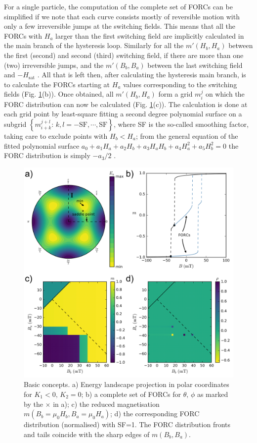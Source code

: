 For a single particle, the computation of the complete set of FORCs can be simplified if we note that each curve consists mostly of reversible motion with only a few irreversible jumps at the switching fields. This means that all the FORCs with $H_a$ larger than the first switching field are implicitly calculated in the main branch of the hysteresis loop. Similarly for all the $m'(H_b, H_a)$ between the first (second) and second (third) switching field, if there are more than one (two) irreversible jumps, and the $m'(B_b, B_a)$ between the last switching field and $-H_{\text{sat}}$ . All that is left then, after calculating the hysteresis main branch, is to calculate the FORCs starting at $H_a$ values corresponding to the switching fields (Fig. \ref{FIG01}(b)). Once obtained, all $m'(H_b, H_a)$ form a grid $m_i^j$ on which the FORC distribution can now be calculated (Fig. \ref{FIG01}(c)). The calculation is done at each grid point by least-square fitting a second degree polynomial surface on a subgrid $\left\{ m_{i+k}^{j+l}:\, k, l=-\text{SF},\cdots,\text{SF} \right\}$, where SF is the so-called smoothing factor, taking care to exclude points with $H_b<H_a$; from the general equation of the fitted polynomial surface $a_0 + a_1 H_a + a_2 H_b + a_3 H_a H_b + a_4 H_a^2 + a_5 H_b^2 = 0$ the FORC distribution is simply $-a_3/2$ \citep{Pike1999}.
\begin{figure}
\includegraphics[width=\textwidth]{research-2/figs/FIG01.pdf}
\caption[Basic FORC modelling concepts]{Basic concepts. a) Energy landscape projection in polar coordinates for $K_1<0,\, K_2=0$; b) a complete set of FORCs for $\theta ,\,\phi$ as marked by the $\boldsymbol{\times}$ in a); c) the reduced magnetisation $m(B_b=\mu_0 H_b, B_a=\mu_0 H_a)$; d) the corresponding FORC distribution (normalised) with SF=1. The FORC distribution fronts and tails coincide with the sharp edges of $m(B_b, B_a)$.}
\label{FIG01}
\end{figure}
